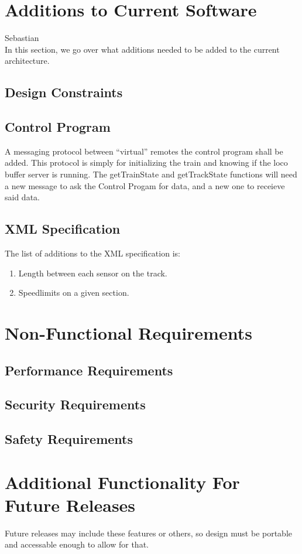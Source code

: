 \documentclass[a4paper,11pt,notitlepage]{article}
\def\CS{Control Progam\xspace} \def\LC{Local Copy of Train State\xspace} \def\TN{Track Node\xspace}
\begin{document}
\newpage
\section{Additions to Current Software}
Sebastian \\
    In this section, we go over what additions needed to be added to the
    current architecture.
\subsection{Design Constraints}
\subsection{Control Program}
    A messaging protocol between ``virtual'' remotes the control program shall be added.  This protocol is simply for initializing the train and knowing if the loco buffer server is running. The getTrainState and getTrackState functions will need a new message to ask the \CS for data, and a new one to receieve said data.
\subsection{XML Specification}
    The list of additions to the XML specification is:
\begin{enumerate}
    \item Length between each sensor on the track.
    \item Speedlimits on a given section.
\end{enumerate}

\newpage
\section{Non-Functional Requirements}
\subsection{Performance Requirements}
\subsection{Security Requirements}
\subsection{Safety Requirements}

\newpage
\section{Additional Functionality For Future Releases}
Future releases may include these features or others, so design must be portable and accessable enough to allow for that.
\end{document}
